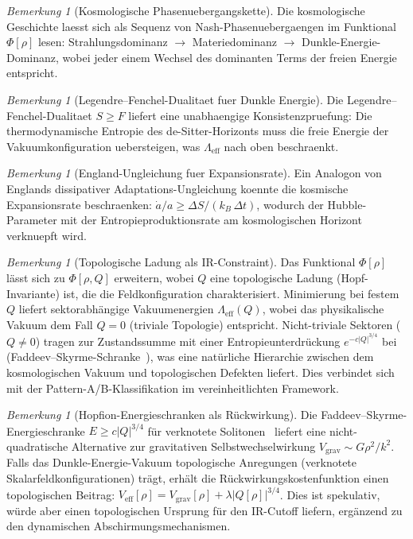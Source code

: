 \documentclass[12pt,a4paper]{article}
\theoremstyle{definition}
\theoremstyle{plain}
\theoremstyle{remark}
\newtheorem{remark}[definition]{Bemerkung}
\begin{document}
\begin{remark}[Kosmologische Phasenuebergangskette]
Die kosmologische Geschichte laesst sich als Sequenz von Nash-Phasenuebergaengen im Funktional $\Phi[\rho]$ lesen: Strahlungsdominanz $\to$ Materiedominanz $\to$ Dunkle-Energie-Dominanz, wobei jeder einem Wechsel des dominanten Terms der freien Energie entspricht.
\end{remark}

\begin{remark}[Legendre--Fenchel-Dualitaet fuer Dunkle Energie]
Die Legendre--Fenchel-Dualitaet $S \geq F$ liefert eine unabhaengige Konsistenzpruefung: Die thermodynamische Entropie des de-Sitter-Horizonts muss die freie Energie der Vakuumkonfiguration uebersteigen, was $\Lambda_{\mathrm{eff}}$ nach oben beschraenkt.
\end{remark}

\begin{remark}[England-Ungleichung fuer Expansionsrate]
Ein Analogon von Englands dissipativer Adaptations-Ungleichung koennte die kosmische Expansionsrate beschraenken: $\dot{a}/a \geq \Delta S / (k_B \, \Delta t)$, wodurch der Hubble-Parameter mit der Entropieproduktionsrate am kosmologischen Horizont verknuepft wird.
\end{remark}

\begin{remark}[Topologische Ladung als IR-Constraint]
\label{rem:topological-charge}
Das Funktional $\Phi[\rho]$ l\"asst sich zu $\Phi[\rho, Q]$ erweitern, wobei $Q$ eine topologische Ladung (Hopf-Invariante) ist, die die Feldkonfiguration charakterisiert. Minimierung bei festem $Q$ liefert sektorabh\"angige Vakuumenergien $\Lambda_{\mathrm{eff}}(Q)$, wobei das physikalische Vakuum dem Fall $Q = 0$ (triviale Topologie) entspricht. Nicht-triviale Sektoren ($Q \neq 0$) tragen zur Zustandssumme mit einer Entropieunterdr\"uckung $e^{-c|Q|^{3/4}}$ bei (Faddeev--Skyrme-Schranke~\cite{LinYang2004}), was eine nat\"urliche Hierarchie zwischen dem kosmologischen Vakuum und topologischen Defekten liefert. Dies verbindet sich mit der Pattern-A/B-Klassifikation im vereinheitlichten Framework.
\end{remark}

\begin{remark}[Hopfion-Energieschranken als R\"uckwirkung]
\label{rem:hopfion-backreaction}
Die Faddeev--Skyrme-Energieschranke $E \geq c |Q|^{3/4}$ f\"ur verknotete Solitonen~\cite{LinYang2004} liefert eine nicht-quadratische Alternative zur gravitativen Selbstwechselwirkung $V_{\mathrm{grav}} \sim G\rho^2/k^2$. Falls das Dunkle-Energie-Vakuum topologische Anregungen (verknotete Skalarfeldkonfigurationen) tr\"agt, erh\"alt die R\"uckwirkungskostenfunktion einen topologischen Beitrag: $V_{\mathrm{eff}}[\rho] = V_{\mathrm{grav}}[\rho] + \lambda |Q[\rho]|^{3/4}$. Dies ist spekulativ, w\"urde aber einen topologischen Ursprung f\"ur den IR-Cutoff liefern, erg\"anzend zu den dynamischen Abschirmungsmechanismen.
\end{remark}
\end{document}
